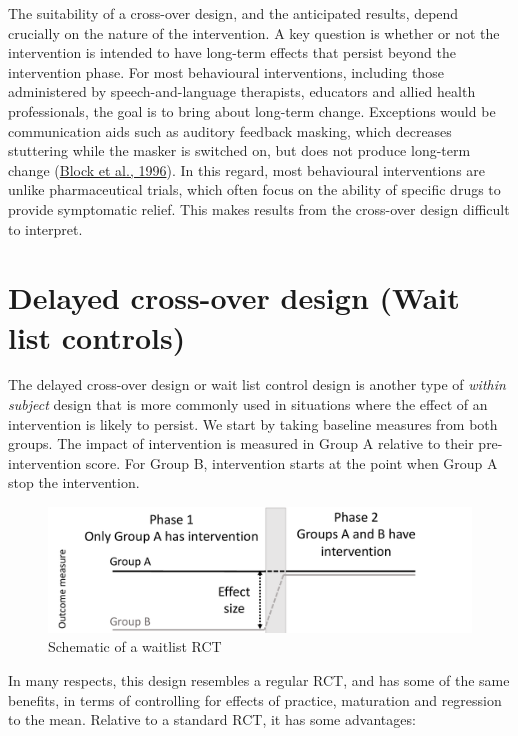 \documentclass{krantz}
\begin{document}
The suitability of a cross-over design, and the anticipated results, depend crucially on the nature of the intervention. A key question is whether or not the intervention is intended to have long-term effects that persist beyond the intervention phase. For most behavioural interventions, including those administered by speech-and-language therapists, educators and allied health professionals, the goal is to bring about long-term change. Exceptions would be communication aids such as auditory feedback masking, which decreases stuttering while the masker is switched on, but does not produce long-term change (\protect\hyperlink{ref-block1996}{Block et al., 1996}). In this regard, most behavioural interventions are unlike pharmaceutical trials, which often focus on the ability of specific drugs to provide symptomatic relief. This makes results from the cross-over design difficult to interpret.

\hypertarget{delayed-cross-over-design-wait-list-controls}{%
\section{Delayed cross-over design (Wait list controls)}\label{delayed-cross-over-design-wait-list-controls}}

The delayed cross-over design or wait list control design is another type of \emph{within subject} design that is more commonly used in situations where the effect of an intervention is likely to persist. We start by taking baseline measures from both groups. The impact of intervention is measured in Group A relative to their pre-intervention score. For Group B, intervention starts at the point when Group A stop the intervention.

\begin{figure}
\includegraphics[width=0.8\linewidth]{images_bw/waitlist} \caption{Schematic of a waitlist RCT}\label{fig:waitlist-plot}
\end{figure}

In many respects, this design resembles a regular RCT, and has some of the same benefits, in terms of controlling for effects of practice, maturation and regression to the mean. Relative to a standard RCT, it has some advantages:
\end{document}

